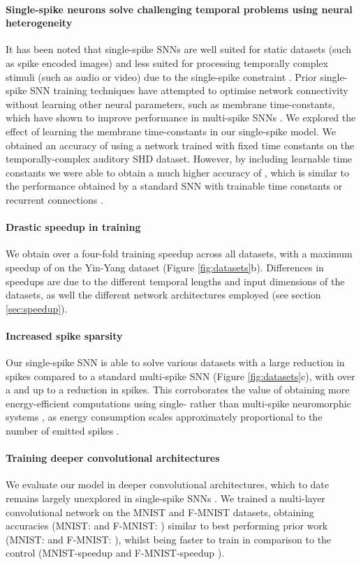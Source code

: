 \documentclass{article} \usepackage{iclr2023_conference,times}
\begin{document}
\paragraph{Single-spike neurons solve challenging temporal problems using neural heterogeneity} It has been noted that single-spike SNNs are well suited for static datasets (such as spike encoded images) and less suited for processing temporally complex stimuli (such as audio or video) due to the single-spike constraint \citep{zenke2021visualizing, eshraghian2021training}. Prior single-spike SNN training techniques have attempted to optimise network connectivity without learning other neural parameters, such as membrane time-constants, which have shown to improve performance in multi-spike SNNs \citep{perez2021neural}. We explored the effect of learning the membrane time-constants in our single-spike model. We obtained an accuracy of  using a network trained with fixed time constants on the temporally-complex auditory SHD dataset. However, by including learnable time constants we were able to obtain a much higher accuracy of , which is similar to the performance obtained by a standard SNN with trainable time constants  or recurrent connections .

\paragraph{Drastic speedup in training} We obtain over a four-fold training speedup across all datasets, with a maximum speedup of  on the Yin-Yang dataset (Figure \ref{fig:datasets}b). Differences in speedups are due to the different temporal lengths and input dimensions of the datasets, as well the different network architectures employed (see section \ref{sec:speedup}).

\paragraph{Increased spike sparsity} Our single-spike SNN is able to solve various datasets with a large reduction in spikes compared to a standard multi-spike SNN (Figure \ref{fig:datasets}c), with over a  and up to a  reduction in spikes. This corroborates the value of obtaining more energy-efficient computations using single- rather than multi-spike neuromorphic systems \citep{liang20211, oh2021spiking, zhou2021temporal}, as energy consumption scales approximately proportional to the number of emitted spikes \citep{panda2020toward}.

\paragraph{Training deeper convolutional architectures} We evaluate our model in deeper convolutional architectures, which to date remains largely unexplored in single-spike SNNs \citep{mirsadeghi2022ds4nn}. We trained a multi-layer convolutional network on the MNIST and F-MNIST datasets, obtaining accuracies (MNIST:  and F-MNIST: ) similar to best performing prior work (MNIST:  and F-MNIST: ), whilst being faster to train in comparison to the control (MNIST-speedup   and F-MNIST-speedup ).
\end{document}
